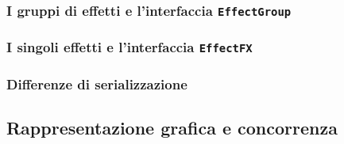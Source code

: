 \subsubsection{I gruppi di effetti e l'interfaccia \texttt{EffectGroup}}\label{subsub:effectGroup}
\subsubsection{I singoli effetti e l'interfaccia \texttt{EffectFX}}\label{subsub:effectFX}
\subsubsection{Differenze di serializzazione}\label{subsub:serializzazione}
\subsection{Rappresentazione grafica e concorrenza}\label{sub:rappresentazione}
